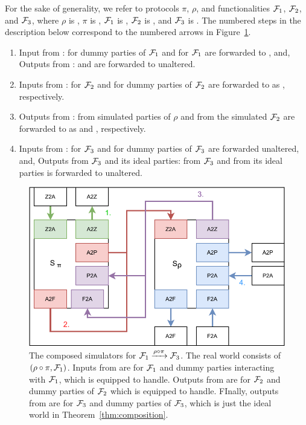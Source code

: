 For the sake of generality, we refer to protocols $\pi$, $\rho$, and functionalities $\mathcal{F}_1$, $\mathcal{F}_2$, and $\mathcal{F}_3$, where $\rho$ is , $\pi$ is , $\mathcal{F}_1$ is \Fro, $\mathcal{F}_2$ is \Fcom, and $\mathcal{F}_3$ is \Fflip.
The numbered steps in the description below correspond to the numbered arrows in Figure~\ref{fig:simcomp}.
\begin{enumerate}
\item Input from \Z:  for dummy parties of $\mathcal{F}_1$ and  for $\mathcal{F}_1$  are forwarded to \SIM{\pi}, and, Outputs from \SIM{\pi}:  and  are forwarded to \Z unaltered.
\item Inputs from \SIM{\pi}:  for $\mathcal{F}_2$ and  for dummy parties of $\mathcal{F}_2$ are forwarded to \SIM{\rho} as  , respectively.
\item Outputs from \SIM{\rho}:  from simulated parties of $\rho$  and  from the simulated $\mathcal{F}_2$ are forwarded to \SIM{\pi} as  and , respectively.
\item Inputs from \SIM{\rho}:  for $\mathcal{F}_3$ and  for dummy parties of $\mathcal{F}_3$ are forwarded unaltered, and, Outputs from $\mathcal{F}_3$ and its ideal parties:  from $\mathcal{F}_3$ and  from its ideal parties is forwarded to \SIM{\rho} unaltered.
\end{enumerate}

\begin{figure}
\centering
\includegraphics[scale=0.62]{figures/simcomp.pdf}
\caption{The composed simulators for $\mathcal{F}_1 \xrightarrow{\rho \circ \pi} \mathcal{F}_3$. The real world consists of $(\rho \circ \pi, \mathcal{F}_1)$. Inputs from \Z are for $\mathcal{F}_1$ and dummy parties interacting with $\mathcal{F}_1$, which \SIM{\pi} is equipped to handle. Outputs from \SIM{\pi} are for $\mathcal{F}_2$ and dummy parties of $\mathcal{F}_2$ which \SIM{\rho} is equipped to handle. FInally, outputs from \SIM{\rho} are for $\mathcal{F}_3$ and dummy parties of $\mathcal{F}_3$, which is just the ideal world in Theorem~\ref{thm:composition}.}
\label{fig:simcomp}
\end{figure}

